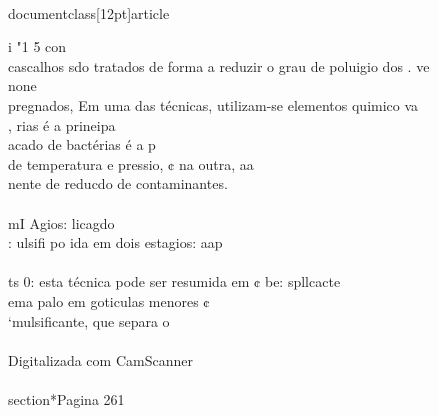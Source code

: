 \\documentclass[12pt]{article}
\begin{document}
{{{{i "1 5 con\\
cascalhos sdo tratados de forma a reduzir o grau de poluigio dos . ve\\
none\\
pregnados, Em uma das técnicas, utilizam-se elementos quimico va\\
, rias é a prineipa\\
acado de bactérias é a p\\
de temperatura e pressio, ¢ na outra, aa\\
nente de reducdo de contaminantes.\\
\\
mI Agios: licagdo\\
: ulsifi po ida em dois estagios: aap\\
\\
ts 0: esta técnica pode ser resumida em ¢ be: spllcacte\\
ema palo em goticulas menores ¢\\
‘mulsificante, que separa o\\
\\
Digitalizada com CamScanner\\

\\section*{Pagina 261}

}}}}
\end{document}
